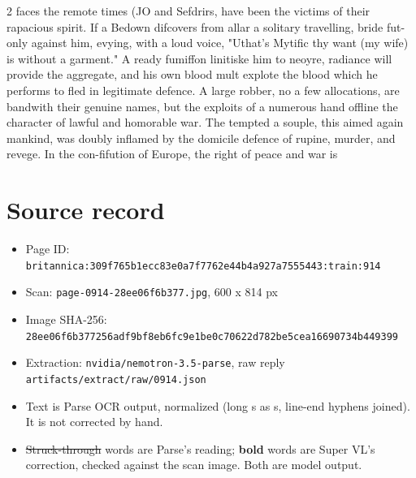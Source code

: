 \documentclass[10pt]{article}
\begin{document}
\begin{multicols}{2}
faces the remote times (JO and Sefdrirs, have been the victims of their rapacious spirit. If a Bedown difcovers from allar a solitary travelling, bride fut-only against him, evying, with a loud voice, "Uthat's Mytific thy want (my wife) is without a garment." A ready fumiffon linitiske him to neoyre, radiance will provide the aggregate, and his own blood mult explote the blood which he performs to fled in legitimate defence. A large robber, no a few allocations, are bandwith their genuine names, but the exploits of a numerous hand offline the character of lawful and homorable war. The tempted a souple, this aimed again mankind, was doubly inflamed by the domicile defence of rupine, murder, and revege. In the con-fifution of Europe, the right of peace and war is
\end{multicols}
\section*{Source record}
\begin{itemize}
\item Page ID: \texttt{britannica:309f765b1ecc83e0a7f7762e44b4a927a7555443:train:914}
\item Scan: \texttt{page-0914-28ee06f6b377.jpg}, 600 x 814 px
\item Image SHA-256: \texttt{\small 28ee06f6b377256adf9bf8eb6fc9e1be0c70622d782be5cea16690734b449399}
\item Extraction: \texttt{nvidia/nemotron-3.5-parse}, raw reply \texttt{artifacts/extract/raw/0914.json}
\item Text is Parse OCR output, normalized (long s as s, line-end hyphens joined). It is not corrected by hand.
\item \sout{Struck-through} words are Parse's reading; \textbf{bold} words are Super VL's correction, checked against the scan image. Both are model output.
\end{itemize}
\end{document}
